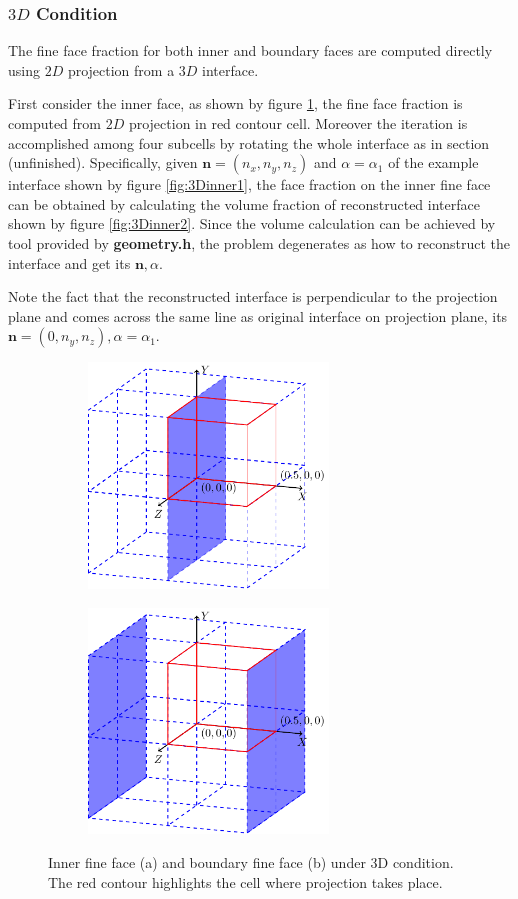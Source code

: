 \documentclass[a4paper]{article}
\begin{document}
\subsubsection{$3D$ Condition}
The fine face fraction for both inner and boundary faces are computed directly using $2D$ projection from a $3D$ interface.\par
First consider the inner face, as shown by figure \ref{fig:3Dinner}, the fine face fraction is computed from $2D$ projection in red contour cell. Moreover the iteration is accomplished among four subcells by rotating the whole interface as in section (unfinished). Specifically, 
given $\mathbf{n}=(n_x,n_y,n_z)$ and $\alpha=\alpha_1$ of the example interface shown by figure \ref{fig:3Dinner1}, the face fraction on the inner fine face can be obtained by calculating the volume fraction of reconstructed interface shown by figure \ref{fig:3Dinner2}. Since the volume calculation can be achieved by tool provided by \textbf{geometry.h}, the problem degenerates as how to reconstruct the interface and get its $\mathbf{n},\alpha$.\par
Note the fact that the reconstructed interface is perpendicular to the projection plane and comes across the same line as original interface on projection plane, its $\mathbf{n}=(0,n_y,n_z), \alpha=\alpha_1$.\par
\begin{figure}[!htbp]
    \centering
    \begin{subfigure}[b]{0.45\textwidth}
        \centering
        \includegraphics[height=6cm]{image/fs_3D3.pdf}
        \subcaption{}
        \label{fig:3Dinner}
    \end{subfigure}
    \begin{subfigure}[b]{0.45\textwidth}
        \centering
        \includegraphics[height=6cm]{image/fs_3D4.pdf}
        \subcaption{}
        \label{fig:3Dboundary}
    \end{subfigure}
    \caption{Inner fine face (a) and boundary fine face (b) under 3D condition. The red contour highlights the cell where projection takes place.}
    \label{fig:3Dface}
\end{figure}
\end{document}
